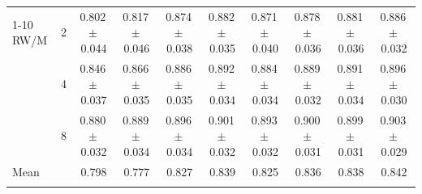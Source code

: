 \begin{tabular}{@{}lc cccc cccc@{}}
\cmidrule(l){1-10}
RW/M & 2 & 0.802\,{\scriptsize$\pm$\,0.044} & 0.817\,{\scriptsize$\pm$\,0.046} & 0.874\,{\scriptsize$\pm$\,0.038} & 0.882\,{\scriptsize$\pm$\,0.035} & 0.871\,{\scriptsize$\pm$\,0.040} & 0.878\,{\scriptsize$\pm$\,0.036} & 0.881\,{\scriptsize$\pm$\,0.036} & 0.886\,{\scriptsize$\pm$\,0.032} \\
 & 4 & 0.846\,{\scriptsize$\pm$\,0.037} & 0.866\,{\scriptsize$\pm$\,0.035} & 0.886\,{\scriptsize$\pm$\,0.035} & 0.892\,{\scriptsize$\pm$\,0.034} & 0.884\,{\scriptsize$\pm$\,0.034} & 0.889\,{\scriptsize$\pm$\,0.032} & 0.891\,{\scriptsize$\pm$\,0.034} & 0.896\,{\scriptsize$\pm$\,0.030} \\
 & 8 & 0.880\,{\scriptsize$\pm$\,0.032} & 0.889\,{\scriptsize$\pm$\,0.034} & 0.896\,{\scriptsize$\pm$\,0.034} & 0.901\,{\scriptsize$\pm$\,0.032} & 0.893\,{\scriptsize$\pm$\,0.032} & 0.900\,{\scriptsize$\pm$\,0.031} & 0.899\,{\scriptsize$\pm$\,0.031} & 0.903\,{\scriptsize$\pm$\,0.029} \\
\midrule
Mean &  & 0.798 & 0.777 & 0.827 & 0.839 & 0.825 & 0.836 & 0.838 & 0.842 \\
\botrule
\end{tabular}
